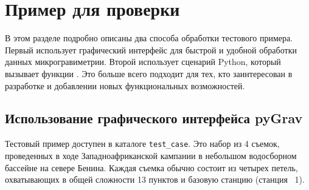 \chapter[Пример для проверки]{Пример для проверки}
\label{chap:test-case}

В этом разделе подробно описаны два способа обработки тестового примера. Первый
использует графический интерфейс \pg{} для быстрой и удобной обработки данных
микрогравиметрии. Второй использует сценарий Python, который вызывает функции
\pg{}. Это больше всего подходит для тех, кто заинтересован в разработке \pg{} и
добавлении новых функциональных возможностей.

\section[Использование графического интерфейса pyGrav]{Использование графического интерфейса pyGrav}
\label{sec:using_pygrav_gui}

Тестовый пример доступен в каталоге \verb|test_case|. Это набор из 4 съемок,
проведенных в ходе Западноафриканской кампании в небольшом водосборном бассейне
на севере Бенина. Каждая съемка обычно состоит из четырех петель, охватывающих в
общей сложности 13 пунктов и базовую станцию (станция \textnumero{}~1). 

